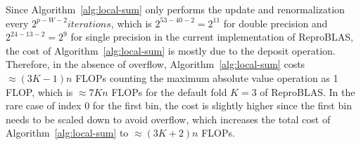   Since Algorithm~\ref{alg:local-sum} only performs the update and renormalization
  every $2^{p-W-2} iterations$, which is $2^{53-40-2}=2^{11}$ for double precision and
  $2^{24-13-2} = 2^9$ for single precision in the current implementation of
  ReproBLAS, the cost of Algorithm~\ref{alg:local-sum} is mostly due to the
  deposit operation.
  Therefore, in the absence of overflow, Algorithm~\ref{alg:local-sum} costs
  $\approx (3K-1)n$ FLOPs counting the maximum absolute value operation as 1 FLOP,
  which is $\approx 7Kn$ FLOPs for the default fold $K=3$ of ReproBLAS.
  In the rare case of index 0 for the first bin,
  the cost is slightly higher since the first bin
  needs to be scaled down to avoid overflow, which increases the
  total cost of Algorithm~\ref{alg:local-sum} to $\approx (3K+2)n$ FLOPs.

